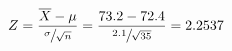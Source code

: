\begin{equation*}
    Z=\frac{\overline{X}-\mu}{\sfrac{\sigma}{\sqrt{n}}}
    =\frac{73.2-72.4}{\sfrac{2.1}{\sqrt{35}}}=2.2537
    \end{equation*}